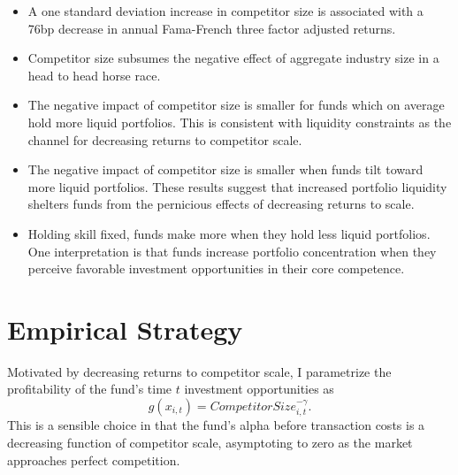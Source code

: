 \documentclass[openany]{book}
\providecommand{\tightlist}{%
  \setlength{\itemsep}{0pt}\setlength{\parskip}{0pt}}
\theoremstyle{definition}
\theoremstyle{definition}
\theoremstyle{definition}
\theoremstyle{remark}
\begin{document}
\begin{itemize}
\tightlist
\item
  A one standard deviation increase in competitor size is associated
  with a 76bp decrease in annual Fama-French three factor adjusted
  returns.
\item
  Competitor size subsumes the negative effect of aggregate industry
  size in a head to head horse race.
\item
  The negative impact of competitor size is smaller for funds which on
  average hold more liquid portfolios. This is consistent with liquidity
  constraints as the channel for decreasing returns to competitor scale.
\item
  The negative impact of competitor size is smaller when funds tilt
  toward more liquid portfolios. These results suggest that increased
  portfolio liquidity shelters funds from the pernicious effects of
  decreasing returns to scale.
\item
  Holding skill fixed, funds make more when they hold less liquid
  portfolios. One interpretation is that funds increase portfolio
  concentration when they perceive favorable investment opportunities in
  their core competence.
\end{itemize}

\hypertarget{empirical-strategy}{%
\section{Empirical Strategy}\label{empirical-strategy}}

Motivated by decreasing returns to competitor scale, I parametrize the
profitability of the fund's time \(t\) investment opportunities as
\begin{equation}
g(x_{i,t})=CompetitorSize_{i,t}^{-\gamma}. 
\label{eq:muParam}
\end{equation} This is a sensible choice in that the fund's alpha before
transaction costs is a decreasing function of competitor scale,
asymptoting to zero as the market approaches perfect competition.
\end{document}
